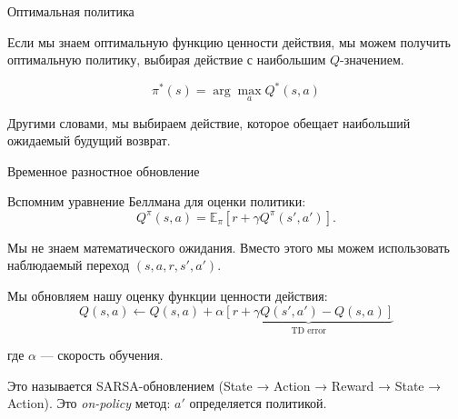 \documentclass{beamer}
\begin{document}
	
	\begin{frame}{Оптимальная политика}
		\begin{flushleft}
			
			Если мы знаем оптимальную функцию ценности действия,
			мы можем получить оптимальную политику, выбирая
			действие с наибольшим $Q$-значением.
			
			\[
			\boxed{
				\pi^*(s)=\arg\max_a Q^*(s,a)
			}
			\]
			
			\vspace{0.4cm}
			
			Другими словами, мы выбираем действие, которое обещает наибольший
			ожидаемый будущий возврат.
			
			
		\end{flushleft}
	\end{frame}
	
	
	
	\begin{frame}{Временное разностное обновление}
		\begin{flushleft}
			
			Вспомним уравнение Беллмана для оценки политики:
			\[
			Q^\pi(s,a)=
			\mathbb{E}_\pi\left[
			r+\gamma Q^\pi(s',a')
			\right].
			\]
			
			\vspace{0.2cm}
			
			Мы не знаем математического ожидания. Вместо этого мы можем использовать
			наблюдаемый переход $(s,a,r,s',a')$.
			
			\vspace{0.2cm}
			
			Мы обновляем нашу оценку функции ценности действия:
			\[
			\boxed{
				Q(s,a)\leftarrow Q(s,a)+\alpha
				\underbrace{
					\left[
					r+\gamma Q(s',a')-Q(s,a)
					\right]
				}_{\text{TD error}}
			}
			\]
			
			где $\alpha$ — скорость обучения.
			
			\medskip
			
			Это называется SARSA-обновлением (State → Action → Reward → State → Action). Это \emph{on-policy} метод: $a'$ определяется политикой.
			
		\end{flushleft}
	\end{frame}
	
\end{document}
